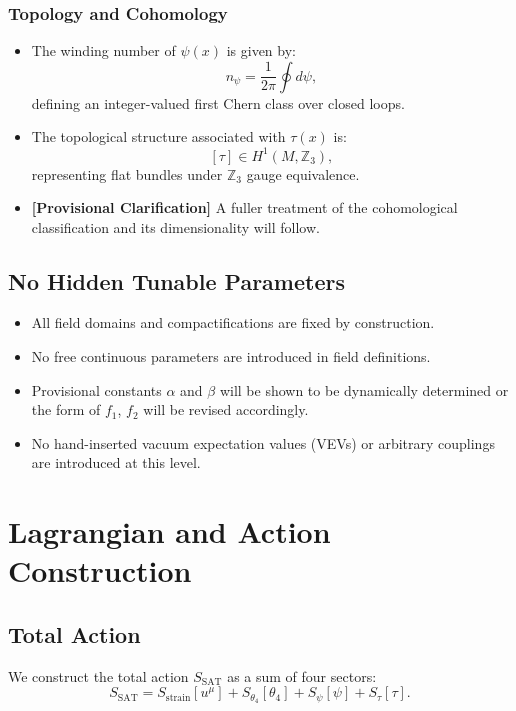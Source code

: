 \documentclass[12pt]{article}
\begin{document}
\subsubsection{Topology and Cohomology}
\begin{itemize}
    \item The winding number of \( \psi(x) \) is given by:
    \[
    n_\psi = \frac{1}{2\pi} \oint d\psi,
    \]
    defining an integer-valued first Chern class over closed loops.
    \item The topological structure associated with \( \tau(x) \) is:
    \[
    [\tau] \in H^1(M, \mathbb{Z}_3),
    \]
    representing flat bundles under \( \mathbb{Z}_3 \) gauge equivalence.
    \item \textbf{[Provisional Clarification]} A fuller treatment of the cohomological classification and its dimensionality will follow.
\end{itemize}

\subsection{No Hidden Tunable Parameters}
\begin{itemize}
    \item All field domains and compactifications are fixed by construction.
    \item No free continuous parameters are introduced in field definitions.
    \item Provisional constants \( \alpha \) and \( \beta \) will be shown to be dynamically determined or the form of \( f_1 \), \( f_2 \) will be revised accordingly.
    \item No hand-inserted vacuum expectation values (VEVs) or arbitrary couplings are introduced at this level.
\end{itemize}

\newpage
\section{Lagrangian and Action Construction}

\subsection{Total Action}

We construct the total action \( S_{\text{SAT}} \) as a sum of four sectors:
\[
S_{\text{SAT}} = S_{\text{strain}}[u^\mu] + S_{\theta_4}[\theta_4] + S_{\psi}[\psi] + S_{\tau}[\tau].
\]
\end{document}
